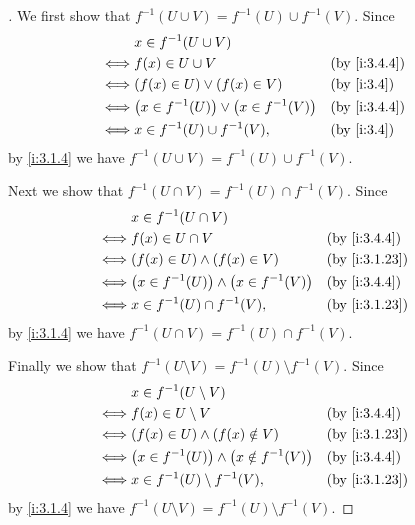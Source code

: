 \begin{proof}[]
  We first show that \(f^{-1}(U \cup V) = f^{-1}(U) \cup f^{-1}(V)\).
  Since
  \begin{align*}
         & x \in f^{-1}(U \cup V)                                           \\
    \iff & f(x) \in U \cup V                              &  & \by{i:3.4.4} \\
    \iff & (f(x) \in U) \lor (f(x) \in V)                 &  & \by{i:3.4}   \\
    \iff & \pa{x \in f^{-1}(U)} \lor \pa{x \in f^{-1}(V)} &  & \by{i:3.4.4} \\
    \iff & x \in f^{-1}(U) \cup f^{-1}(V),                &  & \by{i:3.4}
  \end{align*}
  by \cref{i:3.1.4} we have \(f^{-1}(U \cup V) = f^{-1}(U) \cup f^{-1}(V)\).

  Next we show that \(f^{-1}(U \cap V) = f^{-1}(U) \cap f^{-1}(V)\).
  Since
  \begin{align*}
         & x \in f^{-1}(U \cap V)                                             \\
    \iff & f(x) \in U \cap V                               &  & \by{i:3.4.4}  \\
    \iff & (f(x) \in U) \land (f(x) \in V)                 &  & \by{i:3.1.23} \\
    \iff & \pa{x \in f^{-1}(U)} \land \pa{x \in f^{-1}(V)} &  & \by{i:3.4.4}  \\
    \iff & x \in f^{-1}(U) \cap f^{-1}(V),                 &  & \by{i:3.1.23}
  \end{align*}
  by \cref{i:3.1.4} we have \(f^{-1}(U \cap V) = f^{-1}(U) \cap f^{-1}(V)\).

  Finally we show that \(f^{-1}(U \setminus V) = f^{-1}(U) \setminus f^{-1}(V)\).
  Since
  \begin{align*}
         & x \in f^{-1}(U \setminus V)                                           \\
    \iff & f(x) \in U \setminus V                             &  & \by{i:3.4.4}  \\
    \iff & (f(x) \in U) \land (f(x) \notin V)                 &  & \by{i:3.1.23} \\
    \iff & \pa{x \in f^{-1}(U)} \land \pa{x \notin f^{-1}(V)} &  & \by{i:3.4.4}  \\
    \iff & x \in f^{-1}(U) \setminus f^{-1}(V),               &  & \by{i:3.1.23}
  \end{align*}
  by \cref{i:3.1.4} we have \(f^{-1}(U \setminus V) = f^{-1}(U) \setminus f^{-1}(V)\).
\end{proof}

